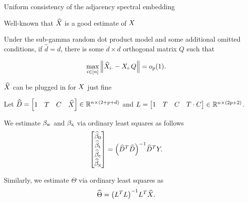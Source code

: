 \documentclass{beamer}
\theoremstyle{remark}
\begin{document}
\begin{frame}{Uniform consistency of the adjacency spectral embedding}

    Well-known that $\widehat{X}$ is a good estimate of $X$

    \begin{lemma}

        Under the sub-gamma random dot product model and some additional omitted conditions, if $\widehat{d} = d$, there is some $d \times d$ orthogonal matrix $Q$ such that

        \begin{equation*}
            \max_{i \in [n]} \, \norm*{\Xhat_{i \cdot} - \X_{i \cdot} Q} = \op{1}.
        \end{equation*}

    \end{lemma}

\end{frame}


\begin{frame}{$\widehat{X}$ can be plugged in for $X$ just fine}

    Let $\widehat{D} = \begin{bmatrix} 1 & T & C  & \widehat{X} \end{bmatrix} \in \mathbb{R}^{n \times (2 + p + d)}$ and $L = \begin{bmatrix} 1 & T & C  & T \cdot C \end{bmatrix} \in \mathbb{R}^{n \times (2 p + 2)}$.

    We estimate $\beta_\text{w}$ and $\beta_\text{x}$ via ordinary least squares as follows
    \begin{equation*}
        \begin{bmatrix}
            \betazerohat \\
            \betathat    \\
            \betachat    \\
            \betaxhat
        \end{bmatrix}
        = \paren*{\Dhat^T \Dhat}^{-1} \Dhat^T Y.
    \end{equation*}

    Similarly, we estimate $\Theta$ via ordinary least squares as
    \begin{equation*}
        \Thetahat
        = \paren*{\Wfull^T \Wfull}^{-1} \Wfull^T \Xhat.
    \end{equation*}
\end{frame}
\end{document}
